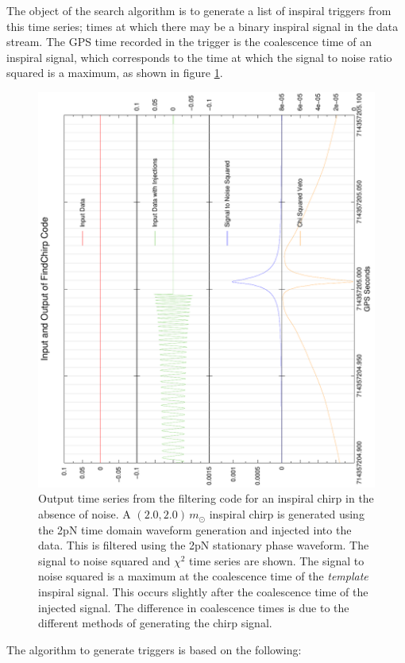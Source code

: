The object of the search algorithm is to generate a list of inspiral triggers
from this time series; times at which there may be a binary inspiral signal in
the data stream. The GPS time recorded in the trigger is the coalescence time of
an inspiral signal, which corresponds to the time at which the signal to noise
ratio squared is a maximum, as shown in figure
\ref{f:zero_inject_zoom}.
\begin{figure}[htp]
\begin{center}
\includegraphics[angle=-90,width=0.75\linewidth]{figures/findchirp/zero_inject_zoom}
\end{center}
\caption{\label{f:zero_inject_zoom}Output time series from the filtering code
for an inspiral chirp in the absence of noise. A $(2.0,2.0)\,m_\odot$ inspiral
chirp is generated using the 2pN time domain waveform generation and injected
into the data. This is filtered using the 2pN stationary phase waveform. The
signal to noise squared and $\chi^2$ time series are shown.  The signal to
noise squared is a maximum at the coalescence time of the \textit{template}
inspiral signal. This occurs slightly after the coalescence time of the
injected signal. The difference in coalescence times is due to the different
methods of generating the chirp signal.
}
\end{figure}
The algorithm to generate triggers is based on the following:
